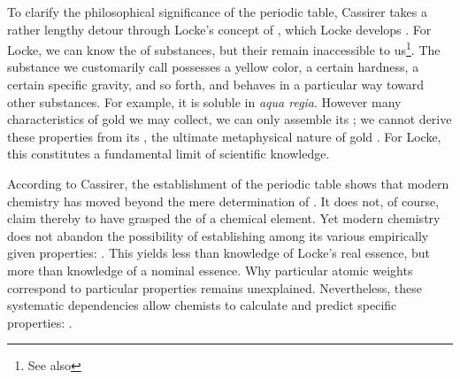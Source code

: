 \documentclass[submitted,12pt]{article}
\begin{document}
To clarify the philosophical significance of the periodic table, Cassirer takes a rather lengthy detour through Locke's concept of , which Locke develops  . For Locke, we can know the  of substances, but their  remain inaccessible to us\footnote{See also }. The substance we customarily call  possesses a yellow color, a certain hardness, a certain specific gravity, and so forth, and behaves in a particular way toward other substances. For example, it is soluble in \textit{aqua regia}. However many characteristics of gold we may collect, we can only assemble its ; we cannot derive these properties from its , the ultimate metaphysical nature of gold \citep[see][6.III]{Cassirer1907b}. For Locke, this constitutes a fundamental limit of scientific knowledge. 

According to Cassirer, the establishment of the periodic table shows that modern chemistry has moved beyond the mere determination of . It does not, of course, claim thereby to have grasped the  of a chemical element. Yet modern chemistry does not abandon the possibility of establishing  among its various empirically given properties:  . This yields less than knowledge of Locke's real essence, but more than knowledge of a nominal essence. Why particular atomic weights correspond to particular properties remains unexplained. Nevertheless, these systematic dependencies allow chemists to calculate and predict specific properties:  .
\end{document}
